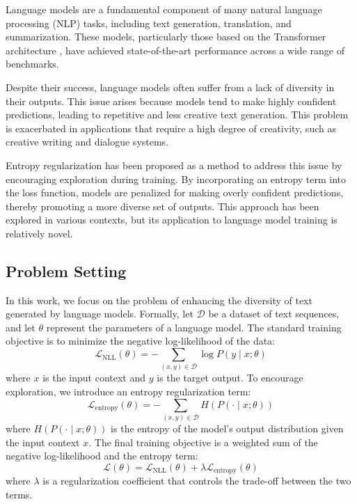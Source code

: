 \documentclass{article} %
\begin{document}
Language models are a fundamental component of many natural language processing (NLP) tasks, including text generation, translation, and summarization. These models, particularly those based on the Transformer architecture \citep{vaswani2017attention}, have achieved state-of-the-art performance across a wide range of benchmarks.

Despite their success, language models often suffer from a lack of diversity in their outputs. This issue arises because models tend to make highly confident predictions, leading to repetitive and less creative text generation. This problem is exacerbated in applications that require a high degree of creativity, such as creative writing and dialogue systems.

Entropy regularization has been proposed as a method to address this issue by encouraging exploration during training. By incorporating an entropy term into the loss function, models are penalized for making overly confident predictions, thereby promoting a more diverse set of outputs. This approach has been explored in various contexts, but its application to language model training is relatively novel.

\subsection{Problem Setting}
In this work, we focus on the problem of enhancing the diversity of text generated by language models. Formally, let \( \mathcal{D} \) be a dataset of text sequences, and let \( \theta \) represent the parameters of a language model. The standard training objective is to minimize the negative log-likelihood of the data:
\[
\mathcal{L}_{\text{NLL}}(\theta) = -\sum_{(x, y) \in \mathcal{D}} \log P(y \mid x; \theta)
\]
where \( x \) is the input context and \( y \) is the target output. To encourage exploration, we introduce an entropy regularization term:
\[
\mathcal{L}_{\text{entropy}}(\theta) = -\sum_{(x, y) \in \mathcal{D}} H(P(\cdot \mid x; \theta))
\]
where \( H(P(\cdot \mid x; \theta)) \) is the entropy of the model's output distribution given the input context \( x \). The final training objective is a weighted sum of the negative log-likelihood and the entropy term:
\[
\mathcal{L}(\theta) = \mathcal{L}_{\text{NLL}}(\theta) + \lambda \mathcal{L}_{\text{entropy}}(\theta)
\]
where \( \lambda \) is a regularization coefficient that controls the trade-off between the two terms.
\end{document}
